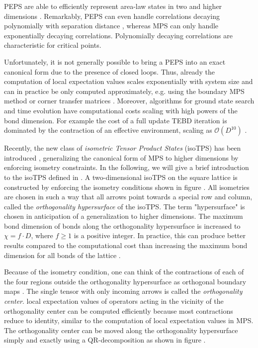 PEPS are able to efficiently represent area-law states in two and higher dimensions \cite{cite:practical_introduction_MPS_and_PEPS}. Remarkably, PEPS can even handle correlations decaying polynomially with separation distance \cite{cite:criticality_the_area_law_and_the_computational_power_of_PEPS}, whereas MPS can only handle exponentially decaying correlations. Polynomially decaying correlations are characteristic for critical points. \par
Unfortunately, it is not generally possible to bring a PEPS into an exact canonical form due to the presence of closed loops. Thus, already the computation of local expectation values scales exponentially with system size and can in practice be only computed approximately, e.g. using the boundary MPS method \cite{cite:practical_introduction_MPS_and_PEPS} or corner transfer matrices \cite{cite:CTMRG}. Moreover, algorithms for ground state search and time evolution have computational costs scaling with high powers of the bond dimension. For example the cost of a full update TEBD iteration is dominated by the contraction of an effective environment, scaling as $\mathcal{O}\left(D^{10}\right)$ \cite{cite:unifying_PEPS_contractions}. \par
Recently, the new class of \textit{isometric Tensor Product States} (isoTPS) has been introduced \cite{cite:isometric_tensor_network_states_in_two_dimensions, cite:conversion_of_PEPS_into_a_canonical_form, cite:DMRG_approach_to_optimizing_2D_tensor_networks}, generalizing the canonical form of MPS to higher dimensions by enforcing isometry constraints. In the following, we will give a brief introduction to the isoTPS defined in \cite{cite:isometric_tensor_network_states_in_two_dimensions}. A two-dimensional isoTPS on the square lattice is constructed by enforcing the isometry conditions shown in figure . All isometries are chosen in such a way that all arrows point towards a special row and column, called the \textit{orthogonality hypersurface} of the isoTPS. The term "hypersurface" is chosen in anticipation of a generalization to higher dimensions. The maximum bond dimension of bonds along the orthogonality hypersurface is increased to $\chi = f\cdot D$, where $f \ge 1$ is a positive integer. In practice, this can produce better results compared to the computational cost than increasing the maximum bond dimension for all bonds of the lattice \cite{cite:efficient_simulation_of_dynamics_in_two_dimensional_quantum_spin_systems}. \par
Because of the isometry condition, one can think of the contractions of each of the four regions outside the orthogonality hypersurface as orthogonal boundary maps \cite{cite:efficient_simulation_of_dynamics_in_two_dimensional_quantum_spin_systems}. The single tensor with only incoming arrows is called the \textit{orthogonality center}. local expectation values of operators acting in the vicinity of the orthogonality center can be computed efficiently because most contractions reduce to identity, similar to the computation of local expectation values in MPS. The orthogonality center can be moved along the orthogonality hypersurface simply and exactly using a QR-decomposition as shown in figure .\par
